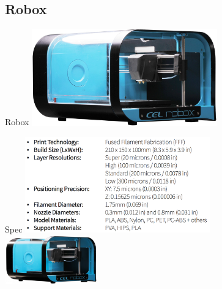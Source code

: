 \documentclass[11pt]{beamer}
\begin{document}

\subsection{Robox}

\begin{frame}[t]{Robox}\footnotesize
\centering
\includegraphics[width=8cm]{./image/17_00.jpg}
\end{frame}

\begin{frame}[t]{Spec}\footnotesize
\includegraphics[width=8cm]{./image/17_01.png}\\
\raggedleft
\includegraphics[width=4cm]{./image/17_08.png}
\end{frame}
\end{document}
